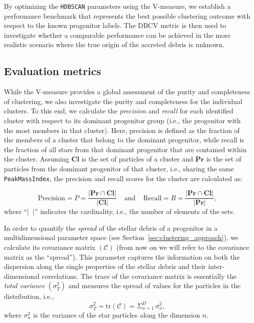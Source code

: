 By optimizing the \texttt{HDBSCAN} parameters using the V-measure, we establish a performance benchmark that represents the best possible clustering outcome with respect to the known progenitor labels. The DBCV metric is then used to investigate whether a comparable performance can be achieved in the more realistic scenario where the true origin of the accreted debris is unknown.

\subsection{Evaluation metrics}

While the V-measure provides a global assessment of the purity and completeness of clustering, we also investigate the purity and completeness for the individual clusters. To this end, we calculate the \textit{precision} and \textit{recall} for each identified cluster with respect to its dominant progenitor group (i.e., the progenitor with the most members in that cluster). Here, precision is defined as the fraction of the members of a cluster that belong to the dominant progenitor, while recall is the fraction of all stars from that dominant progenitor that are contained within the cluster. Assuming $\mathbf{Cl}$ is the set of particles of a cluster and $\mathbf{Pr}$ is the set of particles from the dominant progenitor of that cluster, i.e., sharing the same \texttt{PeakMassIndex}, the precision and recall scores for the cluster are calculated as:

\begin{equation*}
    \mathrm{Precision}= {P} = \frac{| \mathbf{Pr}\cap \mathbf{Cl}|}{|\mathbf{Cl}|} \;\;\;\; \text{and} \;\;\;\; \mathrm{Recall}={R}=\frac{| \mathbf{Pr}\cap \mathbf{Cl|}}{|\mathbf{Pr}|},
\end{equation*}
where ``$|\;\;|$'' indicates the cardinality, i.e., the number of elements of the sets.

In order to quantify the {\it spread} of the stellar debris of a progenitor in a multidimensional parameter space (see Section~\ref{sec:clustering_approach}), we calculate its covariance matrix $(\mathcal{C})$ (from now on we will refer to the covariance matrix as the ``spread''). This parameter captures the information on both the dispersion along the single properties of the stellar debris and their inter-dimensional correlations. The trace of the covariance matrix is essentially the \textit{total variance} $(\sigma_{T}^{2})$ and measures the spread of values for the particles in the distribution, i.e.,
 \begin{equation*}
    \sigma_{T}^{2}=\mathrm{tr}(\mathcal{C})=\Sigma_{n=1}^{D}\,\sigma_{n}^{2},
 \end{equation*}
where $\sigma_{n}^{2}$ is the variance of the star particles along the dimension $n$.

